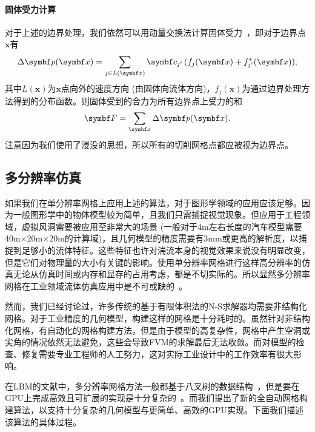 \paragraph{固体受力计算}
对于上述的边界处理，我们依然可以用动量交换法计算固体受力~\cite{Ladd-1994, Mei-2002}，即对于边界点$\bm{x}$有
\begin{equation}
    \Delta \bm{p}(\bm{x})= \sum_{j\in L(\bm{x})} \bm{c}_{j'}\,(f_{j}(\bm{x}) + f^*_{j'}(\bm{x})),\vspace*{-1.5mm}
\end{equation}
其中$L(\bm{x})$为$\bm{x}$点向外的速度方向 (由固体向流体方向)，$f_{j}(\bm{x})$为通过边界处理方法得到的分布函数。则固体受到的合力为所有边界点上受力的和
\begin{equation}
    \bm{F} = \sum_{\bm{x}} \Delta \bm{p}(\bm{x}).\vspace*{-1mm}
\end{equation}
注意因为我们使用了浸没的思想，所以所有的切削网格点都应被视为边界点。

\subsection{多分辨率仿真}
\label{sec:multi-res}
如果我们在单分辨率网格上应用上述的算法，对于图形学领域的应用应该足够。因为一般图形学中的物体模型较为简单，且我们只需捕捉视觉现象。但应用于工程领域，虚拟风洞需要被应用至非常大的场景 (一般对于4m左右长度的汽车模型需要40m$\times$20m$\times$20m的计算域)，且几何模型的精度需要有3mm或更高的解析度，以捕捉到足够小的流体特征。这些特征也许对湍流本身的视觉效果来说没有明显改变，但是它们对物理量的大小有关键的影响。使用单分辨率网格进行这样高分辨率的仿真无论从仿真时间或内存和显存的占用考虑，都是不切实际的。所以显然多分辨率网格在工业领域流体仿真应用中是不可或缺的~\cite{Hou-2019,Aultman-2022,Romani-2022}。

然而，我们已经讨论过，许多传统的基于有限体积法的N-S求解器均需要非结构化网格。对于工业精度的几何模型，构建这样的网格是十分耗时的。虽然针对非结构化网格，有自动化的网格构建方法，但是由于模型的高复杂性，网格中产生空洞或尖角的情况依然无法避免，这些会导致FVM的求解最后无法收敛。而对模型的检查、修复需要专业工程师的人工努力，这对实际工业设计中的工作效率有很大影响。

在LBM的文献中，多分辨率网格方法一般都基于八叉树的数据结构~\cite{EitelAmor-2013,Hasert-2014}，但是要在GPU上完成高效且可扩展的实现是十分复杂的~\cite{Schornbaum-2016, Schornbaum-2018}。而我们提出了新的全自动网格构建算法，以支持十分复杂的几何模型与更简单、高效的GPU实现。下面我们描述该算法的具体过程。

